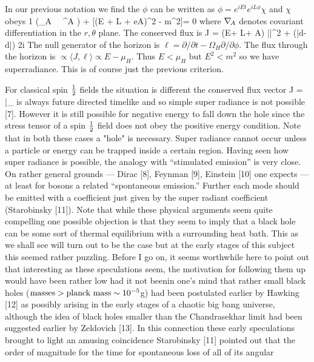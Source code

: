 In our previous notation we find the $\phi$ can be written as $\phi = e^{iEt}e^{iL\phi}\chi$ and $\chi$ obeys
\be
{1 \over \sigma}(\grad_A \, \sigma \, \grad^A \chi) + {[(E \dt + L \dphi + eA)^2 - m^2]}\chi = 0
\ee
where $\grad_A$ denotes covariant differentiation in the $r, \theta$ plane. The conserved flux is
\be
J = (E\dt + L\dphi + A) |\chi|^2 + {(\bar\chi d\chi - \chi d\bar\chi) \over 2i}
\ee
The null generator of the horizon is $\ell = \partial / \partial t - \Omega_H \partial/\partial\phi$.
The flux through the horizon is $\propto \langle J, \ell \rangle \propto E - \mu_H$. Thus $E < \mu_H$
but $E^2 < m^2$ so we have superradiance. This is of course just the previous criterion.

For classical spin $\small{1\over 2}$
fields the situation is different the conserved flux vector
\be
J = \bar\psi \gamma_\mu \psi
\ee
is always future directed timelike and so simple super radiance is not possible [7].
However it is still possible for negative energy to fall down the hole since the stress
tensor of a spin ${1\over 2}$ ﬁeld does not obey the positive energy condition. Note that in both
these cases a "hole" is necessary. Super radiance cannot occur unless a particle or energy
can be trapped inside a certain region. Having seen how super radiance is possible, the analogy
with ``stimulated emission'' is very close. On rather general grounds --- Dirac [8], Feynman [9],
Einstein [10] one expects --- at least for bosons a related ``spontaneous emission.''
Further each mode should be emitted with a coefficient just given by the super radiant
coefficient (Starobinsky [11]). Note that while these physical arguments seem quite
compelling one possible objection is that they seem to imply that a black hole can be some sort
of thermal equilibrium with a surrounding heat bath. This as we shall see will
turn out to be the case but at the early stages of this subject this seemed rather
puzzling. Before I go on, it seems worthwhile here to point out that interesting as these
speculations seem, the motivation for following them up would have been
rather low had it not beenin one's mind that rather small black holes
(${\rm masses} > {\hbox{\rm planck mass}} \sim 10^{-5}$g)
had been postulated earlier by Hawking [12] as possibly arising in the early stages of
a chaotic big bang universe, although the idea of black holes smaller than the Chandrasekhar
limit had been suggested earlier by Zeldovich [13]. In this connection these early
speculations brought to light an amusing coincidence Starobinsky [11] pointed out
that the order of magnitude for the time for spontaneous loss of all of its angular

